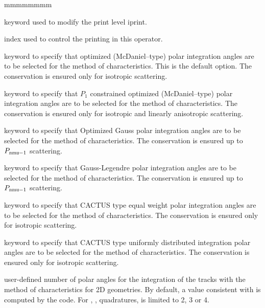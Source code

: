 \begin{ListeDeDescription}{mmmmmmmm}

\item[\moc{EDIT}] keyword used to modify the print level iprint.

\item[\dusa{iprint}] index used to control the printing in this operator.

\item[\moc{LCMD}] keyword to specify that optimized (McDaniel--type) polar integration angles are to be
selected for the method of characteristics.\cite{LCMD} This is the default option. The conservation is ensured only for isotropic scattering.

\item[\moc{OPP1}] keyword to specify that $P_1$ constrained optimized (McDaniel--type) polar integration angles are to be selected for the method of characteristics.\cite{LeTellierpa} The conservation is ensured only for isotropic and linearly anisotropic scattering.

\item[\moc{OGAU}] keyword to specify that Optimized Gauss polar integration angles are to be
selected for the method of characteristics.\cite{LCMD,LeTellierpa} The conservation is ensured up to $P_{\dusa{nmu}-1}$ scattering.

\item[\moc{GAUS}] keyword to specify that Gauss-Legendre polar integration angles are to be selected for the method of characteristics. The conservation is ensured up to $P_{\dusa{nmu}-1}$ scattering.

\item[\moc{CACA}] keyword to specify that CACTUS type equal weight polar integration angles are to be
selected for the method of characteristics.\cite{CACTUS} The conservation is ensured only for isotropic scattering.

\item[\moc{CACB}] keyword to specify that CACTUS type uniformly distributed integration polar angles
are to be selected for the method of characteristics.\cite{CACTUS} The conservation is ensured only for isotropic scattering.

\item[\dusa{nmu}] user-defined number of polar angles for the integration of the tracks with the method of characteristics for 2D geometries. By default, a value consistent with  is computed by the code. For , ,  quadratures,  is limited to 2, 3 or 4.


\end{ListeDeDescription}
